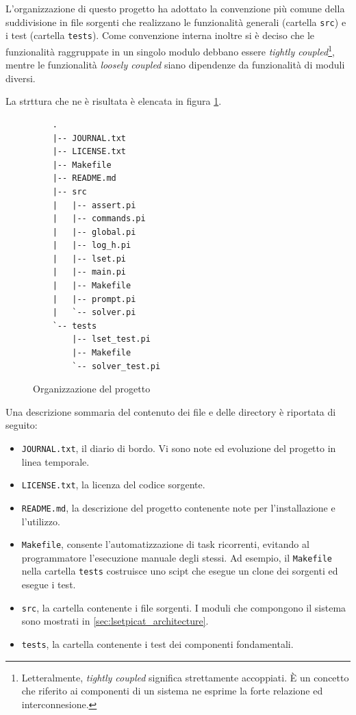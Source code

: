 \documentclass[12pt,a4paper,openright]{book} %
\begin{document}
L'organizzazione di questo progetto ha adottato la convenzione più
comune della suddivisione in file sorgenti che realizzano le
funzionalità generali (cartella \texttt{src}) e i test (cartella
\texttt{tests}). Come convenzione interna inoltre si è deciso che le
funzionalità raggruppate in un singolo modulo debbano essere
\textit{tightly coupled}\footnote{Letteralmente, \textit{tightly
    coupled} significa strettamente accoppiati. \`E un concetto che
  riferito ai componenti di un sistema ne esprime la forte relazione
  ed interconnesione.}, mentre le funzionalità \textit{loosely
  coupled} siano dipendenze da funzionalità di moduli diversi.

La strttura che ne è risultata è elencata in figura
\ref{fig:proj_folder_structure}.

\begin{figure}[]
	\label{fig:proj_folder_structure}
	\begin{verbatim}
	.
	|-- JOURNAL.txt
	|-- LICENSE.txt
	|-- Makefile
	|-- README.md
	|-- src
	|   |-- assert.pi
	|   |-- commands.pi
	|   |-- global.pi
	|   |-- log_h.pi
	|   |-- lset.pi
	|   |-- main.pi
	|   |-- Makefile
	|   |-- prompt.pi
	|   `-- solver.pi
	`-- tests
	    |-- lset_test.pi
	    |-- Makefile
	    `-- solver_test.pi
	\end{verbatim}
	\caption{Organizzazione del progetto}
\end{figure}

Una descrizione sommaria del contenuto dei file e delle directory è
riportata di seguito:
\begin{itemize}
	\item \texttt{JOURNAL.txt}, il diario di bordo. Vi sono note
          ed evoluzione del progetto in linea temporale.
	\item \texttt{LICENSE.txt}, la licenza del codice sorgente.
	\item \texttt{README.md}, la descrizione del progetto
          contenente note per l'installazione e l'utilizzo.
	\item \texttt{Makefile}, consente l'automatizzazione di task
          ricorrenti, evitando al programmatore l'esecuzione manuale
          degli stessi. Ad esempio, il \texttt{Makefile} nella
          cartella \texttt{tests} costruisce uno scipt che esegue un
          clone dei sorgenti ed esegue i test.
	\item \texttt{src}, la cartella contenente i file sorgenti. I
          moduli che compongono il sistema sono mostrati in
          \ref{sec:lsetpicat_architecture}.
	\item \texttt{tests}, la cartella contenente i test dei
          componenti fondamentali.
\end{itemize}
\end{document}
